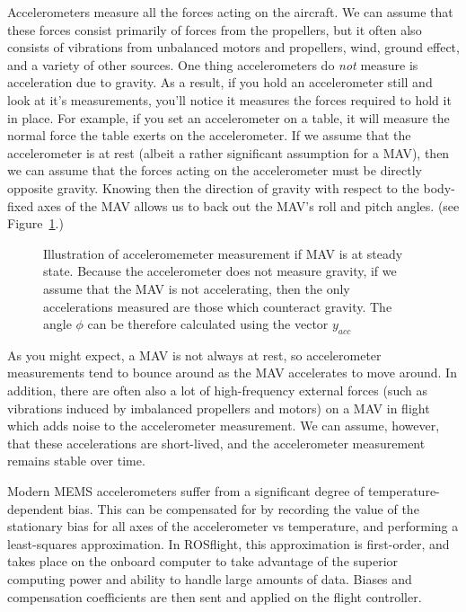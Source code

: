 \documentclass[paper=a4, fontsize=11pt]{scrartcl} %
\numberwithin{equation}{section} %
\numberwithin{figure}{section} %
\numberwithin{table}{section} %
\begin{document}
Accelerometers measure all the forces acting on the aircraft.  We can assume that these forces consist primarily of forces from the propellers, but it often also consists of vibrations from unbalanced motors and propellers, wind, ground effect, and a variety of other sources. One thing accelerometers do \textit{not} measure is acceleration due to gravity.  As a result, if you hold an accelerometer still and look at it's measurements, you'll notice it measures the forces required to hold it in place.  For example, if you set an accelerometer on a table, it will measure the normal force the table exerts on the accelerometer.  If we assume that the accelerometer is at rest (albeit a rather significant assumption for a MAV), then we can assume that the forces acting on the accelerometer must be directly opposite gravity.  Knowing then the direction of gravity with respect to the body-fixed axes of the MAV allows us to back out the MAV's roll and pitch angles.  (see Figure~\ref{fig:accelerometer_measure}.)

\begin{figure}[h]
\centering
\caption{Illustration of acceleromemeter measurement if MAV is at steady state.  Because the accelerometer does not measure gravity, if we assume that the MAV is not accelerating, then the only accelerations measured are those which counteract gravity.  The angle $\phi$ can be therefore calculated using the vector $y_{acc}$}
\label{fig:accelerometer_measure}

\end{figure}

As you might expect, a MAV is not always at rest, so accelerometer measurements tend to bounce around as the MAV accelerates to move around.  In addition, there are often also a lot of high-frequency external forces (such as vibrations induced by imbalanced propellers and motors) on a MAV in flight which adds noise to the accelerometer measurement.  We can assume, however, that these accelerations are short-lived, and the accelerometer measurement remains stable over time.

Modern MEMS accelerometers suffer from a significant degree of temperature-dependent bias.  This can be compensated for by recording the value of the stationary bias for all axes of the accelerometer vs temperature, and performing a least-squares approximation.  In ROSflight, this approximation is first-order, and takes place on the onboard computer to take advantage of the superior computing power and ability to handle large amounts of data.  Biases and compensation coefficients are then sent and applied on the flight controller.
\end{document}
